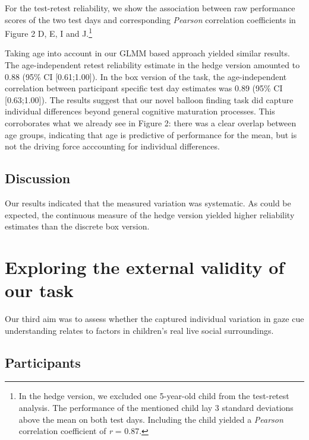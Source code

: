 \documentclass[
  man,floatsintext]{apa6}
\begin{document}
For the test-retest reliability, we show the association between raw performance scores of the two test days and corresponding \emph{Pearson} correlation coefficients in Figure 2 D, E, I and J.\footnote{In the hedge version, we excluded one 5-year-old child from the test-retest analysis. The performance of the mentioned child lay 3 standard deviations above the mean on both test days. Including the child yielded a \emph{Pearson} correlation coefficient of \emph{r} = 0.87.}

Taking age into account in our GLMM based approach yielded similar results. The age-independent retest reliability estimate in the hedge version amounted to 0.88 (95\% CI {[}0.61;1.00{]}).
In the box version of the task, the age-independent correlation between participant specific test day estimates was 0.89 (95\% CI {[}0.63;1.00{]}). The results suggest that our novel balloon finding task did capture individual differences beyond general cognitive maturation processes. This corroborates what we already see in Figure 2: there was a clear overlap between age groups, indicating that age is predictive of performance for the mean, but is not the driving force acccounting for individual differences.

\hypertarget{discussion-1}{%
\subsection{Discussion}\label{discussion-1}}

Our results indicated that the measured variation was systematic. As could be expected, the continuous measure of the hedge version yielded higher reliability estimates than the discrete box version.

\hypertarget{exploring-the-external-validity-of-our-task}{%
\section{Exploring the external validity of our task}\label{exploring-the-external-validity-of-our-task}}

Our third aim was to assess whether the captured individual variation in gaze cue understanding relates to factors in children's real live social surroundings.

\hypertarget{participants-2}{%
\subsection{Participants}\label{participants-2}}
\end{document}
